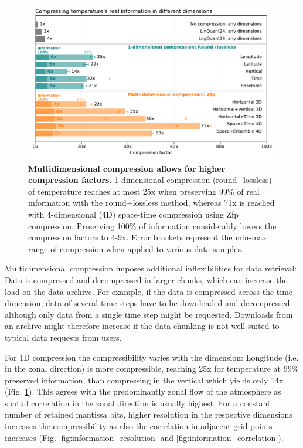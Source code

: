 \begin{figure}[tbhp]
	\includegraphics[width=1\textwidth]{Figures/compression/compressfac_comparison.pdf}
	\caption{\textbf{Multidimensional compression allows for higher compression factors.}
	\mbox{1-dimensional} compression (round+lossless) of temperature reaches at most 25x when preserving 99\% 
	of real information with the round+lossless method, whereas 71x is reached with 4-dimensional (4D)
	space-time compression using Zfp compression. Preserving 100\% of information considerably lowers
	the compression factors to 4-9x. Error brackets represent the min-max range of compression when
	applied to various data samples.}
	\label{fig:compressfac_comparison}
\end{figure}

Multidimensional compression imposes additional inflexibilities for data retrieval: Data is compressed and decompressed
in larger chunks, which can increase the load on the data archive. For example, if the data is compressed across the time
dimension, data of several time steps have to be downloaded and decompressed although only data from a single time
step might be requested. Downloads from an archive might therefore increase if the data chunking is not well suited to
typical data requests from users. 

For 1D compression the compressibility varies with the dimension: Longitude (i.e. in the zonal direction) is more compressible,
reaching 25x for temperature at 99\% preserved information, than compressing in the vertical which yields only 14x
(Fig. \ref{fig:compressfac_comparison}). This agrees with the predominantly zonal flow of the atmosphere as spatial
correlation in the zonal direction is usually highest. For a constant number of retained mantissa bits, higher resolution
in the respective dimensions increases the compressibility as also the correlation in adjacent grid points increases
(Fig. \ref{fig:information_resolution} and \ref{fig:information_correlation}).

